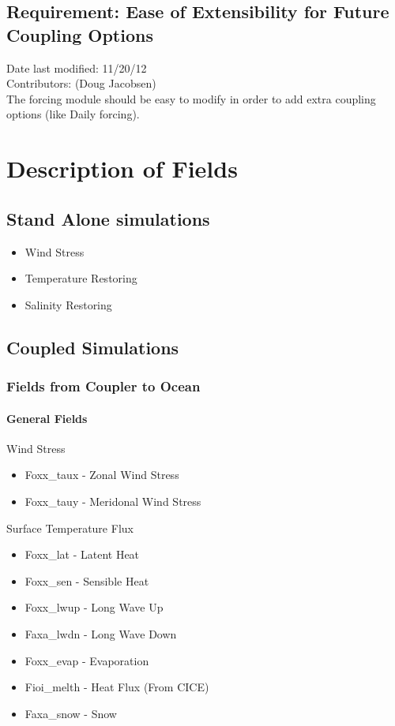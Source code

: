 \documentclass[11pt]{report}
\begin{document}
\section{Requirement: Ease of Extensibility for Future Coupling Options}
Date last modified: 11/20/12 \\
Contributors: (Doug Jacobsen) \\

The forcing module should be easy to modify in order to add extra coupling options (like Daily forcing).


\chapter{Description of Fields}

\section{Stand Alone simulations}
\begin{itemize}
	\item Wind Stress
	\item Temperature Restoring
	\item Salinity Restoring
\end{itemize}

\section{Coupled Simulations}
\subsection{Fields from Coupler to Ocean}
\subsubsection{General Fields}
\noindent Wind Stress
\begin{itemize}
	\item Foxx\_taux  - Zonal Wind Stress
	\item Foxx\_tauy  - Meridonal Wind Stress
\end{itemize}

\noindent Surface Temperature Flux
\begin{itemize}
	\item Foxx\_lat   - Latent Heat
	\item Foxx\_sen   - Sensible Heat
	\item Foxx\_lwup  - Long Wave Up
	\item Faxa\_lwdn  - Long Wave Down
	\item Foxx\_evap  - Evaporation
	\item Fioi\_melth - Heat Flux (From CICE)
	\item Faxa\_snow  - Snow
\end{itemize}
\end{document}
